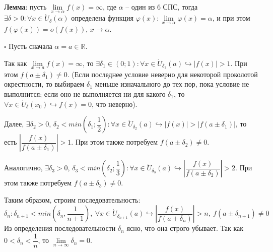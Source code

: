 \documentclass[12pt, a4paper, reqno]{article}
\begin{document}
    \textbf{Лемма}: пусть $\lim\limits_{x\to\alpha} f(x) = \infty$, где $\alpha$ -- один из 6 СПС,
    тогда $\exists\delta > 0: \forall x\in \mathring U_{\delta}(\alpha)$ определена функция
    $\varphi(x): \lim\limits_{x\to\alpha} \varphi(x) = \alpha$, и при этом $f(\varphi(x)) = o(f(x))$,
    $x\to\alpha$.

    $\square$ Пусть сначала $\alpha = a\in\mathbb{R}$.

    Так как $\lim\limits_{x\to a} f(x) = \infty$, то $\exists\delta_1\in (0; 1): \forall x\in
    \mathring U_{\delta_1}(a)\hookrightarrow |f(x)| > 1$. При этом $f(a \pm \delta_1)\neq 0$. (Если
    последнее условие неверно для некоторой проколотой окрестности, то выбираем $\delta_1$ меньше
    изначального до тех пор, пока условие не выполнится; если оно не выполняется ни для какого
    $\delta_1$, то $\forall x\in\mathring U_{\delta}(x_0)\hookrightarrow f(x) = 0$, что неверно).

    Далее, $\exists\delta_2 > 0$, $\delta_2 < min\left(\delta_1; \dfrac{1}{2}\right): \forall
    x\in\mathring U_{\delta_2}(a)\hookrightarrow |f(x)| > |f(a \pm \delta_1)|$, то есть
    $\left|\dfrac{f(x)}{f(a \pm \delta_1)}\right| > 1$. При этом также потребуем
    $f(a \pm \delta_2)\neq 0$.

    Аналогично, $\exists\delta_3 > 0$, $\delta_3 < min\left(\delta_2; \dfrac{1}{3}\right): \forall
    x\in\mathring U_{\delta_3}(a)\hookrightarrow \left|\dfrac{f(x)}{f(a \pm \delta_2)}\right| > 2$.
    При этом также потребуем $f(a \pm \delta_3)\neq 0$.

    Таким образом, строим последовательность:
    \begin{equation*}
        \delta_n: \delta_{n + 1} < min\left(\delta_n, \dfrac{1}{n + 1}\right),\
        \forall x\in\mathring U_{\delta_{n + 1}}(a)\hookrightarrow
        \left|\dfrac{f(x)}{f(a \pm \delta_n)}\right| > n,\ f(a \pm \delta_{n + 1})\neq 0
    \end{equation*}
    Из определения последовательности $\delta_n$ ясно, что она строго убывает. Так как
    $0 < \delta_n < \dfrac{1}{n}$, то $\lim\limits_{n\to\infty} \delta_n = 0$.
\end{document}
